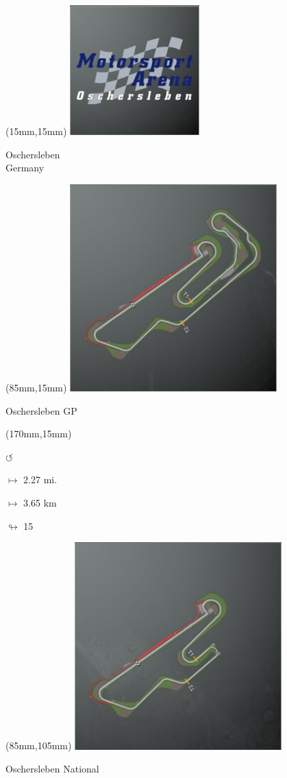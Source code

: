 \begin{textblock*}{60mm}(15mm,15mm)%
\includegraphics[width=50mm]{LG/2015-05-20_00090.png}
\par Oschersleben\\ Germany
\end{textblock*}
\begin{textblock*}{80mm}(85mm,15mm)%
\includegraphics[width=80mm]{TR/2015-05-20_00045.png}
\centerline{Oschersleben GP}
\end{textblock*}
\begin{textblock*}{30mm}(170mm,15mm)%
\par \Huge$\circlearrowleft$
\Large
\par$\mapsto$ 2.27 mi.
\par$\mapsto$ 3.65 km
\par$\looparrowright$ 15
\end{textblock*}
\begin{textblock*}{80mm}(85mm,105mm)%
\includegraphics[width=80mm]{TR/2015-05-20_00046.png}
\centerline{Oschersleben National}
\end{textblock*}
